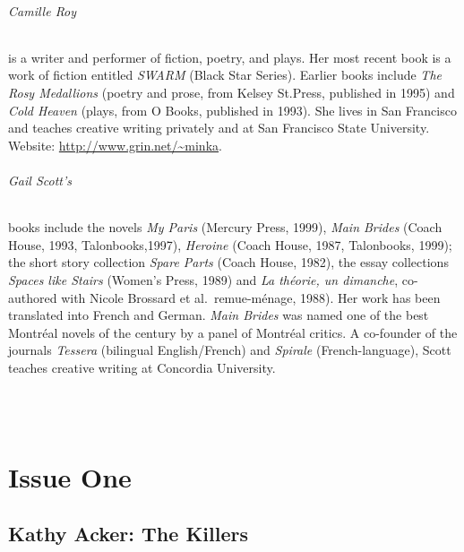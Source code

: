 \documentclass[
]{memoir}
\begin{document}
\hypertarget{camille-roy-1}{%
\paragraph{Camille Roy}\label{camille-roy-1}}

is a writer and performer of fiction, poetry, and plays. Her most recent
book is a work of fiction entitled \emph{SWARM} (Black Star Series).
Earlier books include \emph{The Rosy Medallions} (poetry and prose, from
Kelsey St.Press, published in 1995) and \emph{Cold Heaven} (plays, from
O Books, published in 1993). She lives in San Francisco and teaches
creative writing privately and at San Francisco State University.
Website:
\href{http://www.grin.net/\%7Eminka}{http://www.grin.net/\textasciitilde{}minka}.

\hypertarget{gail-scotts-1}{%
\paragraph{Gail Scott's}\label{gail-scotts-1}}

books include the novels \emph{My Paris} (Mercury Press, 1999),
\emph{Main Brides} (Coach House, 1993, Talonbooks,1997), \emph{Heroine}
(Coach House, 1987, Talonbooks, 1999); the short story collection
\emph{Spare Parts} (Coach House, 1982), the essay collections
\emph{Spaces like Stairs} (Women's Press, 1989) and \emph{La théorie, un
dimanche}, co-authored with Nicole Brossard et al.~remue-ménage, 1988).
Her work has been translated into French and German. \emph{Main Brides}
was named one of the best Montréal novels of the century by a panel of
Montréal critics. A co-founder of the journals \emph{Tessera} (bilingual
English/French) and \emph{Spirale} (French-language), Scott teaches
creative writing at Concordia University.\\

~

~

\mainmatter

\part*{Issue One}

\hypertarget{kathy-acker-the-killers}{%
\chapter{Kathy Acker: The Killers}\label{kathy-acker-the-killers}}
\end{document}
